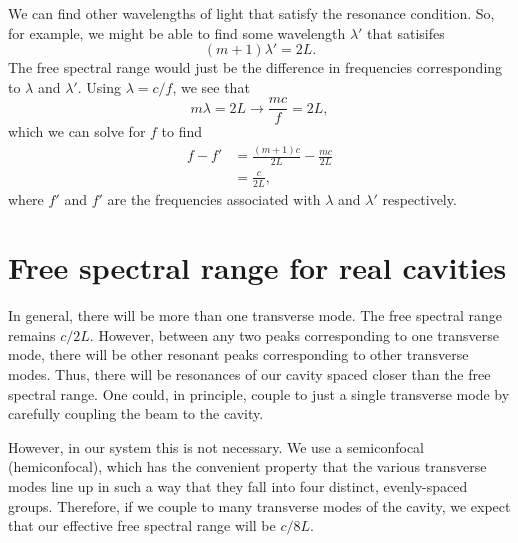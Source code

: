 We can find other wavelengths of light that satisfy the resonance condition. So, for example, we might be able to find some wavelength $\lambda'$ that satisifes
\begin{equation}
(m+1)\lambda'=2L.
\end{equation}
The free spectral range would just be the difference in frequencies corresponding to $\lambda$ and $\lambda'$. Using $\lambda = c/f$, we see that 
\begin{equation}
m\lambda= 2L \rightarrow \frac{mc}{f}=2L,
\end{equation}
which we can solve for $f$ to find 
\begin{align}
f-f'&= \frac{(m+1)c}{2L}-\frac{m c}{2L}\\
&= \frac{c}{2L},
\end{align}
where $f'$ and $f'$ are the frequencies associated with $\lambda$ and $\lambda'$ respectively. 

\section{Free spectral range for real cavities}
In general, there will be more than one transverse mode. The free spectral range remains $c/2L$. However, between any two peaks corresponding to one transverse mode, there will be other resonant peaks corresponding to other transverse modes. Thus, there will be resonances of our cavity spaced closer than the free spectral range. One could, in principle, couple to just a single transverse mode by carefully coupling the beam to the cavity.

However, in our system this is not necessary. We use a semiconfocal (hemiconfocal), which has the convenient property that the various transverse modes line up in such a way that they fall into four distinct, evenly-spaced groups. Therefore, if we couple to many transverse modes of the cavity, we expect that our effective free spectral range will be $c/8L$.

